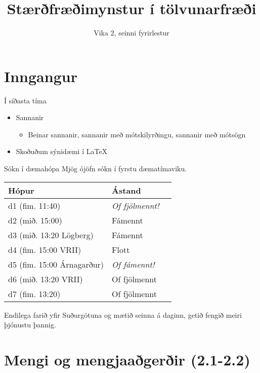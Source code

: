 \documentclass[handout]{beamer}
\title{Stærðfræðimynstur í tölvunarfræði}
\subtitle{Vika 2, seinni fyrirlestur}
\begin{document}
\begin{frame}
\titlepage
\end{frame}

\section{Inngangur}

\begin{frame}{Í síðasta tíma}
    \begin{itemize}
        \item Sannanir
        \begin{itemize}
            \item Beinar sannanir, sannanir með mótskilyrðingu, sannanir með mótsögn
        \end{itemize}
        \item Skoðuðum sýnidæmi í \LaTeX
    \end{itemize}
\end{frame}

\begin{frame}{Sókn í dæmahópa}
    Mjög ójöfn sókn í fyrstu dæmatímaviku.
    \begin{center}
        \begin{tabular}{lll}
            \toprule
            Hópur&Ástand\\
            \midrule
            d1 (fim. 11:40)&\emph{Of fjölmennt!}\\
            d2 (mið. 15:00)&Fámennt\\
            d3 (mið. 13:20 Lögberg)&Fámennt\\
            d4 (fim. 15:00 VRII)&Flott\\
            d5 (fim. 15:00 Árnagarður)&\emph{Of fámennt!}\\
            d6 (mið. 13:20 VRII)&Of fjölmennt\\
            d7 (fim. 13:20)& Of fjölmennt\\
            \bottomrule
        \end{tabular}
    \end{center}
    Endilega farið yfir Suðurgötuna og mætið seinna á daginn, getið fengið meiri þjónustu þannig.
\end{frame}

\section{Mengi og mengjaaðgerðir (2.1-2.2)}
\end{document}
